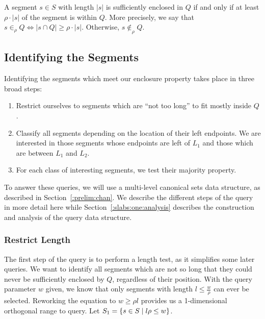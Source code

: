 A segment $s \in S$ with length $|s|$ is sufficiently enclosed in $Q$ if and only if at least $\rho \cdot |s|$ of the segment is within $Q$. More precisely, we say that $s \in_\rho Q \Leftrightarrow |s \cap Q| \geq \rho \cdot |s|$. Otherwise, $s \not \in_\rho Q$.


\subsection{Identifying the Segments}
\label{:slabs:one:approach}

Identifying the segments which meet our enclosure property takes place in three broad steps:

\begin{enumerate}
 \item Restrict ourselves to segments which are ``not too long'' to fit mostly inside $Q$.

 \item Classify all segments depending on the location of their left endpoints. We are interested in those segments whose endpoints are left of $L_1$ and those which are between $L_1$ and $L_2$.

 \item For each class of interesting segments, we test their majority property.

\end{enumerate}

To answer these queries, we will use a multi-level canonical sets data structure, as described in Section~\ref{:prelim:chan}. We describe the different steps of the query in more detail here while Section~\ref{:slabs:one:analysis} describes the construction and analysis of the query data structure.


\subsubsection{Restrict Length}
\label{:slabs:one:details:restrict}

The first step of the query is to perform a length test, as it simplifies some later queries.  We want to identify all segments which are not so long that they could never be sufficiently enclosed by $Q$, regardless of their position. With the query parameter $w$ given, we know that only segments with length $l \leq \frac{w}{\rho}$ can ever be selected. Reworking the equation to $w \geq \rho l$ provides us a 1-dimensional orthogonal range to query. Let $S_1 = \{ s \in S \;|\; l \rho \leq w \}$.


